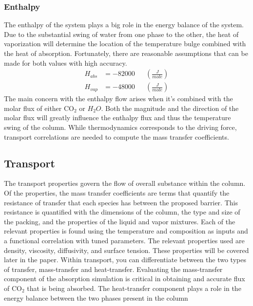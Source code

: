 \documentclass[12pt, letterpaper]{article}
\begin{document}
            \subsubsection{Enthalpy}
                The enthalpy of the system plays a big role in the energy balance of the system.
                Due to the substantial swing of water from one phase to the other, the heat of vaporization will determine the location of the temperature bulge combined with the heat of absorption.
                Fortunately, there are reasonable assumptions that can be made for both values with high accuracy.
                \begin{align}
                    H_{abs} &= -82000 && \left(\frac{\unit{J}}{\unit{mole}} \right) \\
                    H_{vap} &= -48000 && \left(\frac{\unit{J}}{\unit{mole}} \right)
                \end{align}
                The main concern with the enthalpy flow arises when it's combined with the molar flux of either $\mathrm{CO}_2$ or $H_{2}O$.
                Both the magnitude and the direction of the molar flux will greatly influence the enthalpy flux and thus the temperature swing of the column.
                While thermodynamics corresponds to the driving force, transport correlations are needed to compute the mass transfer coefficients.
    
        \subsection{Transport}\label{subsec:transport}
            
            The transport properties govern the flow of overall substance within the column.
            Of the properties, the mass transfer coefficients are terms that quantify the resistance of transfer that each species has between the proposed barrier.
            This resistance is quantified with the dimensions of the column, the type and size of the packing, and the properties of the liquid and vapor mixtures.
            Each of the relevant properties is found using the temperature and composition as inputs and a functional correlation with tuned parameters.
            The relevant properties used are density, viscosity, diffusivity, and surface tension.
            These properties will be covered later in the paper.
            Within transport, you can differentiate between the two types of transfer, mass-transfer and heat-transfer.
            Evaluating the mass-transfer component of the absorption simulation is critical in obtaining and accurate flux of $\mathrm{CO}_2$ that is being absorbed.
            The heat-transfer component plays a role in the energy balance between the two phases present in the column
    
\end{document}
